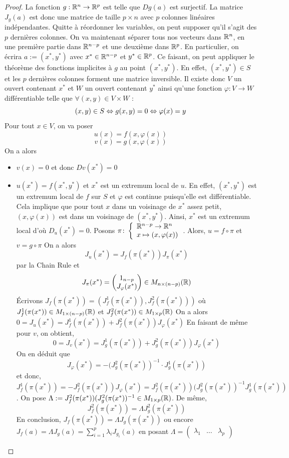 \begin{proof}
    La fonction $g : \mathbb{R}^n\to \mathbb{R}^p$ est telle que $Dg(a)$ est surjectif.
    La matrice $J_g(a)$ est donc une matrice de taille $p\times n$ avec $p$ colonnes linéaires indépendantes. Quitte à réordonner les variables, on peut supposer qu'il s'agit des $p$ dernières colonnes. 
    On va maintenant séparer tous nos vecteurs dans $\mathbb{R}^n$, en une première partie dans $\mathbb{R}^{n-p}$ et une deuxième dans $\mathbb{R}^p$. 
    En particulier, on écrira $a := (x^*,y^*)$ avec $x^*\in\mathbb{R}^{n-p}$ et $y^*\in\mathbb{R}^p$. Ce faisant, on peut appliquer le théorème des fonctions implicites à $g$ au point $(x^*,y^*)$. En effet, $(x^*,y^*)\in S$ et les $p$ dernières colonnes forment une matrice inversible.
    Il existe donc $V$ un ouvert contenant $x^*$ et $W$ un ouvert contenant $y^*$
    ainsi qu'une fonction $\varphi : V \to W$ différentiable telle que $\forall (x,y)\in V \times W$ :
    $$(x,y)\in S\Leftrightarrow g(x,y) = 0\Leftrightarrow \varphi(x) = y$$
    Pour tout $x \in V$, on va poser 
    $$u(x) = f(x,\varphi(x))$$
    $$v(x) = g(x,\varphi(x))$$
    On a alors \begin{itemize}
        \item $v(x) = 0$ et donc $Dv(x^*) = 0$
        \item $u(x^*) = f(x^*,y^*)$ et $x^*$ est un extremum local de $u$. En effet, $(x^*,y^*)$ est un extremum local de $f$ sur $S$ et $\varphi$ est continue puisqu'elle est différentiable. Cela implique que pour tout $x$ dans un voisinage de $x^*$ assez petit, $(x,\varphi(x))$ est dans un voisinage de $(x^*,y^*)$. Ainsi, $x^*$ est un extremum local d'où $D_u(x^*) = 0$. Posons $\pi\colon \left\{\begin{array}{l}\mathbb{R}^{n-p}\to \mathbb{R}^n \\x\mapsto (x,\varphi(x))\end{array}\right.$.
        Alors, $u = f\circ\pi$ et $v = g\circ\pi$
        On a alors 
        $$J_u(x^*) = J_f(\pi(x^*))J_{\pi}(x^*)$$ par la Chain Rule et
        $$ J_{\pi}(x^*) = \begin{pmatrix}
            1_{n-p} \\
            J_{\varphi}(x^*)
        \end{pmatrix}\in M_{n\times (n-p)}(\mathbb{R})$$
        Écrivons $J_f(\pi(x^*)) = (J^1_f(\pi(x^*)),J^2_f(\pi(x^*)))$ où $J^1_f(\pi(x^*))\in M_{1\times (n-p)}(\mathbb{R})$ et $ J^2_f(\pi(x^*))\in M_{1\times p}(\mathbb{R})$
        On a alors $0 = J_u(x^*) = J^1_f(\pi(x^*)) + J^2_f(\pi(x^*))J_{\varphi}(x^*) $
        En faisant de même pour $v$, on obtient,
        $$0 = J_v(x^*) = J^1_g(\pi(x^*)) + J^2_g(\pi(x^*))J_{\varphi}(x^*)$$
        On en déduit que 
        $$J_{\varphi}(x^*) = -(J_g^2(\pi(x^*))^{-1}\cdot J^1_g(\pi(x^*))$$
        et donc, $J_f^1(\pi(x^*)) = -J_f^2(\pi(x^*))J_{\varphi}(x^*) = J_f^2(\pi(x^*))(J_g^2(\pi(x^*))^{-1}J^1_g(\pi(x^*))$. On pose $\Lambda:= J_f^2(\pi(x^*))(J_g^2(\pi(x^*))^{-1}\in M_{1\times p}(\mathbb{R})$.
        De même, 
        $$J_f^2(\pi(x^*)) = \Lambda J^2_g(\pi(x^*))$$
        En conclusion,
        $J_f(\pi(x^*)) = \Lambda J_g(\pi(x^*))$ ou encore $J_f(a) = \Lambda J_g(a)=\sum_{i=1}^p\lambda_iJ_{g_i}(a)$ en posant $\Lambda = \begin{pmatrix}
            \lambda_1&\dotsc&\lambda_p
        \end{pmatrix}$
        \end{itemize} 
\end{proof}
